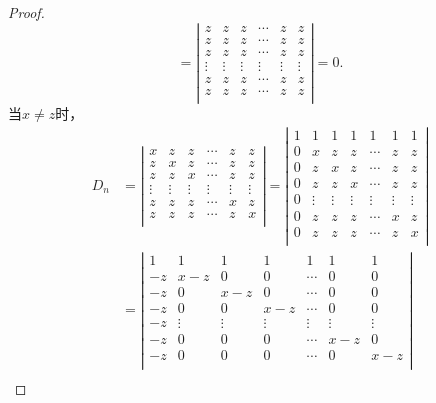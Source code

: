 \begin{enumerate}[1~]
\begin{proof}
\[= \left| \begin{matrix}
	z&		z&		z&		\cdots&		z&		z\\
	z&		z&		z&		\cdots&		z&		z\\
	z&		z&		z&		\cdots&		z&		z\\
	\vdots&		\vdots&		\vdots&		\vdots&		\vdots&		\vdots\\
	z&		z&		z&		\cdots&		z&		z\\
	z&		z&		z&		\cdots&		z&		z\\
\end{matrix} \right|=0.
\]
当$x\ne z$时，
\begin{align*}
D _ { n } 
&= \left| \begin{matrix}
	x&		z&		z&		\cdots&		z&		z\\
	z&		x&		z&		\cdots&		z&		z\\
	z&		z&		x&		\cdots&		z&		z\\
	\vdots&		\vdots&		\vdots&		\vdots&		\vdots&		\vdots\\
	z&		z&		z&		\cdots&		x&		z\\
	z&		z&		z&		\cdots&		z&		x\\
\end{matrix} \right|
=\left| \begin{matrix}
	1&		1&		1&		1&		1&		1&		1\\
	0&		x&		z&		z&		\cdots&		z&		z\\
	0&		z&		x&		z&		\cdots&		z&		z\\
	0&		z&		z&		x&		\cdots&		z&		z\\
	0&		\vdots&		\vdots&		\vdots&		\vdots&		\vdots&		\vdots\\
	0&		z&		z&		z&		\cdots&		x&		z\\
	0&		z&		z&		z&		\cdots&		z&		x\\
\end{matrix} \right|\\
&=\left| \begin{matrix}
	1&		1&		1&		1&		1&		1&		1\\
	-z&		x-z&		0&		0&		\cdots&		0&		0\\
	-z&		0&		x-z&		0&		\cdots&		0&		0\\
	-z&		0&		0&		x-z&		\cdots&		0&		0\\
	-z&		\vdots&		\vdots&		\vdots&		\vdots&		\vdots&		\vdots\\
	-z&		0&		0&		0&		\cdots&		x-z&		0\\
	-z&		0&		0&		0&		\cdots&		0&		x-z\\
\end{matrix} \right|\\

\end{align*}
\end{proof}
\end{enumerate}
